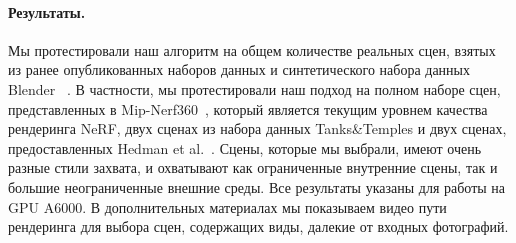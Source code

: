 \paragraph{Результаты.}
Мы протестировали наш алгоритм на общем количестве  реальных сцен, взятых из ранее опубликованных наборов данных и синтетического набора данных Blender ~\cite{mildenhall2020nerf}. 
В частности, мы протестировали наш подход на полном наборе сцен, представленных в Mip-Nerf360~\cite{barron2022mipnerf360}, который является текущим уровнем качества рендеринга NeRF, двух сценах из набора данных Tanks\&Temples  и двух сценах, предоставленных Hedman et al.~\cite{hedman2018deep}. 
Сцены, которые мы выбрали, имеют очень разные стили захвата, и охватывают как ограниченные внутренние сцены, так и большие неограниченные внешние среды.
 Все результаты указаны для работы на GPU A6000.
В дополнительных материалах мы показываем видео пути рендеринга для выбора сцен, содержащих виды, далекие от входных фотографий.

